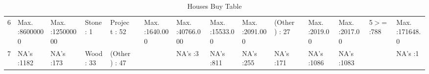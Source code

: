 \begin{table}[ht]
\begin{tabular}{rlllllllllllllll}
  6 & Max.   :86000000   & Max.   :125000000   & Stone           :   1   & Project              : 52   &  & Max.   :1640.000   & Max.   :40766.000   & Max.   :15533.00   & Max.   :2091.000   & (Other)                              : 27   &  & Max.   :2019.00   & Max.   :2017.00   & 5$>$=       :788   & Max.   :171648.0   \\ 
  7 & NA's   :1182   & NA's   :173   & Wood            :  33   & (Other)              : 47   &  &  & NA's   :3   & NA's   :811   & NA's   :255   & NA's                                 :171   &  & NA's   :1086   & NA's   :1083   &  & NA's   :1   \\ 
   \hline
\end{tabular}
\caption{Houses Buy Table} 
\label{tab:one}
\end{table}
